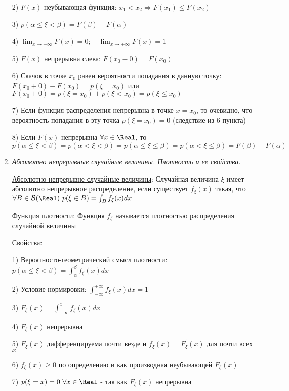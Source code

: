 \begin{enumerate}
    2) $F(x)$ неубывающая функция: $x_1 < x_2 \Longrightarrow F(x_1) \leq F(x_2)$ 

    3) $p(\alpha \leq \xi < \beta) = F(\beta) - F(\alpha)$

    4) $\lim_{x \to -\infty} F(x) = 0; \quad \lim_{x \to +\infty} F(x) = 1$
    
    5) $F(x)$ непрерывна слева: $F(x_0 - 0) = F(x_0)$

    6) Скачок в точке $x_0$ равен вероятности попадания в данную точку: $F(x_0 + 0) - F(x_0) = p(\xi = x_0)$ или $F(x_0 + 0) = p(\xi = x_0) + p(\xi < x_0) = p(\xi \leq x_0)$

    7) Если функция распределения непрерывна в точке $x = x_0$, то очевидно, что вероятность попадания в эту точка $p(\xi = x_0) = 0$ (следствие из 6 пункта)
    
    8) Если $F(x)$ непрерывна $\forall x \in \Real$, то $p(\alpha \leq \xi < \beta) = p(\alpha < \xi < \beta) = p(\alpha \leq \xi \leq \beta) = p(\alpha < \xi \leq \beta) = F(\beta) - F(\alpha)$
    
    \item \textit{Абсолютно непрерывные случайные величины. Плотность и ее свойства.}

    \hyperlink{continuousdistributionproperties}{Абсолютно непрерывне случайные величины}: Случайная величина $\xi$ имеет абсолютно непрерывное распределение, если существует $f_\xi(x)$ такая, что $\forall B \in \mathcal{B}(\Real)
    \ p(\xi \in B) = \int_B f_\xi(x)dx$

    \hyperlink{densityfunctiondefinition}{Функция плотности}: Функция $f_\xi$ называется плотностью распределения случайной величины

    \hyperlink{densityfunctionproperties}{Свойства}:

    1) Вероятносто-геометрический смысл плотности: $p(\alpha \leq \xi < \beta) = \int_{\alpha}^\beta f_\xi(x) dx$

    2) Условие нормировки: $\int_{-\infty}^{+\infty} f_\xi(x)dx = 1$

    3) $F_\xi(x) = \int_{-\infty}^x f_\xi(x)dx$

    4) $F_\xi(x)$ непрерывна 

    5) $F_\xi(x)$ дифференцируема почти везде и $f_\xi(x) = F^\prime_\xi(x)$ для почти всех $x$

    6) $f_\xi(x) \geq 0$ по определению и как производная неубывающей $F_\xi(x)$

    7) $p(\xi = x) = 0 \ \forall x \in \Real$ - так как $F_\xi(x)$ непрерывна


\end{enumerate}
